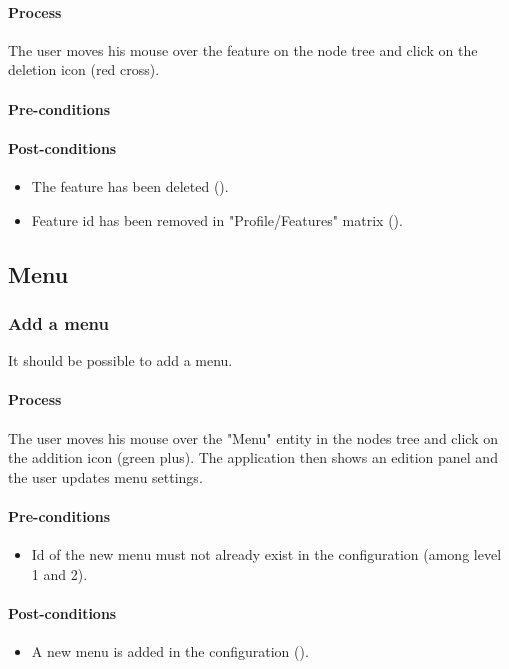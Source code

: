 \documentclass[11pt,a4paper,oneside]{article}
\begin{document}
\paragraph{Process}
The user moves his mouse over the feature on the node tree and click on the deletion icon (red cross).

\paragraph{Pre-conditions}

\paragraph{Post-conditions}
\begin{itemize}
	\item The feature has been deleted ().
	\item Feature id has been removed in "Profile/Features" matrix ().
\end{itemize}

\subsection{Menu}

\subsubsection{Add a menu}
It should be possible to add a menu.

\paragraph{Process}
The user moves his mouse over the "Menu" entity in the nodes tree and click on the addition icon (green plus). The application then shows an edition panel and the user updates menu settings.

\paragraph{Pre-conditions}
\begin{itemize}
	\item Id of the new menu must not already exist in the configuration (among level 1 and 2).
\end{itemize}

\paragraph{Post-conditions}
\begin{itemize}
	\item A new menu is added in the configuration ().
\end{itemize}
\end{document}
